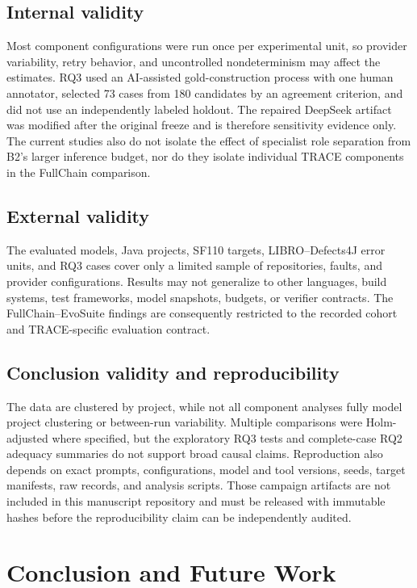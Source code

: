 \documentclass[pdflatex,sn-basic,Numbered,iicol]{sn-jnl}
\begin{document}
\subsection{Internal validity}

Most component configurations were run once per experimental unit, so provider variability, retry behavior, and uncontrolled nondeterminism may affect the estimates. RQ3 used an AI-assisted gold-construction process with one human annotator, selected 73 cases from 180 candidates by an agreement criterion, and did not use an independently labeled holdout. The repaired DeepSeek artifact was modified after the original freeze and is therefore sensitivity evidence only. The current studies also do not isolate the effect of specialist role separation from B2's larger inference budget, nor do they isolate individual TRACE components in the FullChain comparison.

\subsection{External validity}

The evaluated models, Java projects, SF110 targets, LIBRO--Defects4J error units, and RQ3 cases cover only a limited sample of repositories, faults, and provider configurations. Results may not generalize to other languages, build systems, test frameworks, model snapshots, budgets, or verifier contracts. The FullChain--EvoSuite findings are consequently restricted to the recorded cohort and TRACE-specific evaluation contract.

\subsection{Conclusion validity and reproducibility}

The data are clustered by project, while not all component analyses fully model project clustering or between-run variability. Multiple comparisons were Holm-adjusted where specified, but the exploratory RQ3 tests and complete-case RQ2 adequacy summaries do not support broad causal claims. Reproduction also depends on exact prompts, configurations, model and tool versions, seeds, target manifests, raw records, and analysis scripts. Those campaign artifacts are not included in this manuscript repository and must be released with immutable hashes before the reproducibility claim can be independently audited.

\section{Conclusion and Future Work}\label{sec:conclusion}
\end{document}
